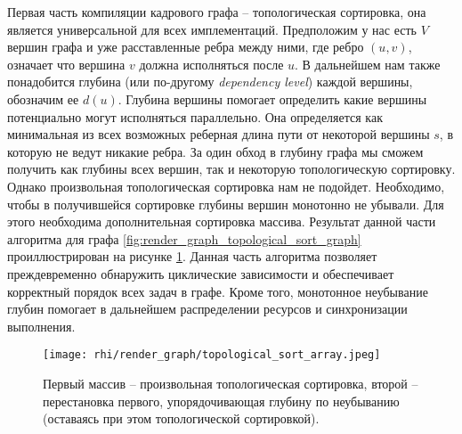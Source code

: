 Первая часть компиляции кадрового графа -- топологическая сортировка, она является универсальной для всех имплементаций. Предположим у нас есть $V$ вершин графа и уже расставленные ребра между ними, где ребро $(u, v)$, означает что вершина $v$ должна исполняться после $u$. В дальнейшем нам также понадобится глубина (или по-другому \textit{dependency level}) каждой вершины, обозначим ее $d(u)$. Глубина вершины помогает определить какие вершины потенциально могут исполняться параллельно. Она определяется как минимальная из всех возможных реберная длина пути от некоторой вершины $s$, в которую не ведут никакие ребра. За один обход в глубину графа мы сможем получить как глубины всех вершин, так и некоторую топологическую сортировку. Однако произвольная топологическая сортировка нам не подойдет. Необходимо, чтобы в получившейся сортировке глубины вершин монотонно не убывали. Для этого необходима дополнительная сортировка массива. Результат данной части алгоритма для графа \ref{fig:render_graph_topological_sort_graph} проиллюстрирован на рисунке \ref{fig:render_graph_topological_sort_arrays}. Данная часть алгоритма позволяет преждевременно обнаружить циклические зависимости и обеспечивает корректный порядок всех задач в графе. Кроме того, монотонное неубывание глубин помогает в дальнейшем распределении ресурсов и синхронизации выполнения.

\begin{figure}[h]
    \centering
    \texttt{[image: rhi/render\_graph/topological\_sort\_array.jpeg]}
    \caption{Первый массив -- произвольная топологическая сортировка, второй -- перестановка первого, упорядочивающая глубину по неубыванию (оставаясь при этом топологической сортировкой).}
    \label{fig:render_graph_topological_sort_arrays}
\end{figure}

